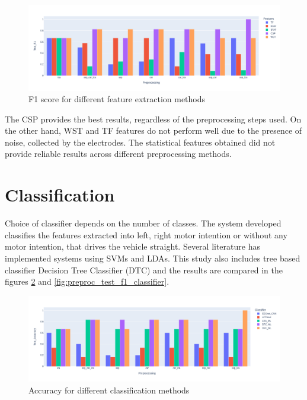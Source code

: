      \begin{figure}[H] 
     \begin{center}
        \includegraphics[width=1.0\textwidth]{images/preproc_test_f1_features_bar.png}
        \caption{F1 score for different feature extraction methods}
        \label{fig:preproc_test_f1_features}
        \end{center}
    \end{figure}

The CSP provides the best results, regardless of the preprocessing steps used. On the other hand, WST and TF features do not perform well due to the presence of noise, collected by the electrodes. The statistical features obtained did not provide reliable results across different preprocessing methods.

\section{Classification}
Choice of classifier depends on the number of classes. The system developed classifies the features extracted into left, right motor intention or without any motor intention, that drives the vehicle straight. Several literature has implemented systems using SVMs and LDAs. This study also includes tree based classifier Decision Tree Classifier (DTC) and the results are compared in the figures \ref{fig:preproc_test_acc_classifier} and \ref{fig:preproc_test_f1_classifier}.

     \begin{figure}[H] 
     \begin{center}
        \includegraphics[width=1.0\textwidth]{images/preproc_test_acc_classifier_bar.png}
        \caption{Accuracy for different classification methods}
        \label{fig:preproc_test_acc_classifier}
        \end{center}
    \end{figure}

